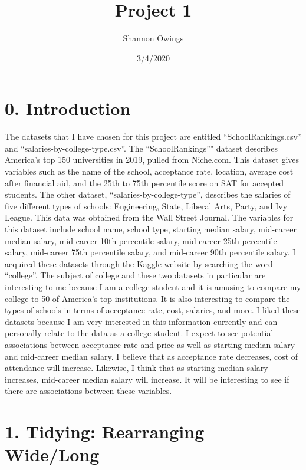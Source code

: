 \documentclass[]{article}
\title{Project 1}
\author{Shannon Owings}
\date{3/4/2020}
\begin{document}
\maketitle

\section{0. Introduction}\label{introduction}

The datasets that I have chosen for this project are entitled
``SchoolRankings.csv'' and ``salaries-by-college-type.csv''. The
``SchoolRankings''" dataset describes America's top 150 universities in
2019, pulled from Niche.com. This dataset gives variables such as the
name of the school, acceptance rate, location, average cost after
financial aid, and the 25th to 75th percentile score on SAT for accepted
students. The other dataset, ``salaries-by-college-type'', describes the
salaries of five different types of schools: Engineering, State, Liberal
Arts, Party, and Ivy League. This data was obtained from the Wall Street
Journal. The variables for this dataset include school name, school
type, starting median salary, mid-career median salary, mid-career 10th
percentile salary, mid-career 25th percentile salary, mid-career 75th
percentile salary, and mid-career 90th percentile salary. I acquired
these datasets through the Kaggle website by searching the word
``college''. The subject of college and these two datasets in particular
are interesting to me because I am a college student and it is amusing
to compare my college to 50 of America's top institutions. It is also
interesting to compare the types of schools in terms of acceptance rate,
cost, salaries, and more. I liked these datasets because I am very
interested in this information currently and can personally relate to
the data as a college student. I expect to see potential associations
between acceptance rate and price as well as starting median salary and
mid-career median salary. I believe that as acceptance rate decreases,
cost of attendance will increase. Likewise, I think that as starting
median salary increases, mid-career median salary will increase. It will
be interesting to see if there are associations between these variables.

\section{1. Tidying: Rearranging
Wide/Long}\label{tidying-rearranging-widelong}
\end{document}

